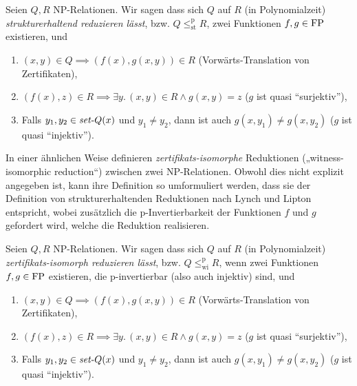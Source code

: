 \begin{definition}
    Seien $Q, R$ NP-Relationen. Wir sagen dass sich $Q$ auf $R$ (in Polynomialzeit) \emph{strukturerhaltend reduzieren lässt}, bzw. $Q\leq_\mathrm{st}^\mathrm p R$, zwei Funktionen $f, g\in\mathrm{FP}$ existieren, und
    \begin{enumerate}
        \item $(x,y)\in Q \implies (f(x), g(x,y))\in R$ (Vorwärts-Translation von Zertifikaten),
        \item $(f(x),z)\in R \implies \exists y.\, (x,y)\in R\land g(x,y)=z$ ($g$ ist quasi “surjektiv”),
        \item Falls $y_1,y_2\in \mathit{set}\text{-}{}Q(x)$ und $y_1\neq y_2$, dann ist auch $g(x,y_1)\neq g(x,y_2)$ ($g$ ist quasi “injektiv”). \qedhere
    \end{enumerate}
\end{definition}

In einer ähnlichen Weise definieren \cite{wiedermann_witness-isomorphic_1995} \emph{zertifikats-isomorphe} Reduktionen („witness-isomorphic reduction“) zwischen zwei NP-Relationen. Obwohl dies nicht explizit angegeben ist, kann ihre Definition so umformuliert werden, dass sie der Definition von strukturerhaltenden Reduktionen nach Lynch und Lipton entspricht, wobei zusätzlich die p-Invertierbarkeit der Funktionen $f$ und $g$ gefordert wird, welche die Reduktion realisieren.


\begin{definition}
    Seien $Q, R$ NP-Relationen. Wir sagen dass sich $Q$ auf $R$ (in Polynomialzeit) \emph{zertifikats-isomorph reduzieren lässt}, bzw. $Q\leq_\mathrm{wi}^\mathrm p R$, wenn zwei Funktionen $f, g\in \mathrm{FP}$ existieren, die p-invertierbar (also auch injektiv) sind, und 
    \begin{enumerate}
        \item $(x,y)\in Q \implies (f(x), g(x,y))\in R$ (Vorwärts-Translation von Zertifikaten),
        \item $(f(x),z)\in R \implies \exists y.\, (x,y)\in R\land g(x,y)=z$ ($g$ ist quasi “surjektiv”),
        \item Falls $y_1,y_2\in \mathit{set}\text{-}{}Q(x)$ und $y_1\neq y_2$, dann ist auch $g(x,y_1)\neq g(x,y_2)$ ($g$ ist quasi “injektiv”). \qedhere
    \end{enumerate}
\end{definition}

